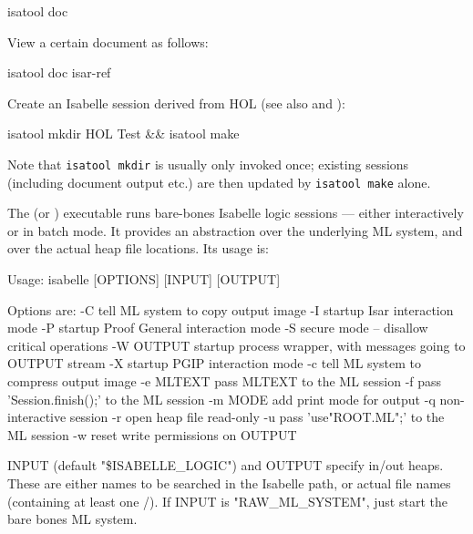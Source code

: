\begin{isabellebody}
\begin{isamarkuptext}
\begin{ttbox}
  isatool doc
\end{ttbox}

  View a certain document as follows:
\begin{ttbox}
  isatool doc isar-ref
\end{ttbox}

  Create an Isabelle session derived from HOL (see also
   and ):
\begin{ttbox}
  isatool mkdir HOL Test && isatool make
\end{ttbox}
  Note that \verb|isatool mkdir| is usually only invoked once;
  existing sessions (including document output etc.) are then updated
  by \verb|isatool make| alone.%
\end{isamarkuptext}%
\isamarkuptrue%
%
\isamarkuptrue%
%
\begin{isamarkuptext}%
The \hyperlink{executable.isabelle}{\mbox{}} (or \hyperlink{executable.isabelle-process}{\mbox{}}) executable runs bare-bones Isabelle logic
  sessions --- either interactively or in batch mode.  It provides an
  abstraction over the underlying ML system, and over the actual heap
  file locations.  Its usage is:

\begin{ttbox}
Usage: isabelle [OPTIONS] [INPUT] [OUTPUT]

  Options are:
    -C           tell ML system to copy output image
    -I           startup Isar interaction mode
    -P           startup Proof General interaction mode
    -S           secure mode -- disallow critical operations
    -W OUTPUT    startup process wrapper, with messages going to OUTPUT stream
    -X           startup PGIP interaction mode
    -c           tell ML system to compress output image
    -e MLTEXT    pass MLTEXT to the ML session
    -f           pass 'Session.finish();' to the ML session
    -m MODE      add print mode for output
    -q           non-interactive session
    -r           open heap file read-only
    -u           pass 'use"ROOT.ML";' to the ML session
    -w           reset write permissions on OUTPUT

  INPUT (default "\$ISABELLE_LOGIC") and OUTPUT specify in/out heaps.
  These are either names to be searched in the Isabelle path, or
  actual file names (containing at least one /).
  If INPUT is "RAW_ML_SYSTEM", just start the bare bones ML system.
\end{ttbox}


\end{isamarkuptext}
\end{isabellebody}
